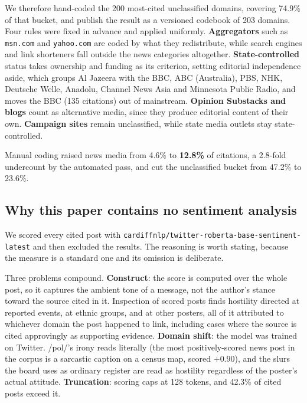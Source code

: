 \documentclass[11pt]{article}
\begin{document}
We therefore hand-coded the 200 most-cited unclassified domains, covering 74.9\%
of that bucket, and publish the result as a versioned codebook of 203 domains.
Four rules were fixed in advance and applied uniformly. \textbf{Aggregators}
such as \texttt{msn.com} and \texttt{yahoo.com} are coded by what they
redistribute, while search engines and link shorteners fall outside the news
categories altogether. \textbf{State-controlled} status takes ownership and
funding as its criterion, setting editorial independence aside, which groups Al
Jazeera with the BBC, ABC (Australia), PBS, NHK, Deutsche Welle, Anadolu,
Channel News Asia and Minnesota Public Radio, and moves the BBC (135 citations)
out of mainstream. \textbf{Opinion Substacks and blogs} count as alternative
media, since they produce editorial content of their own. \textbf{Campaign
sites} remain unclassified, while state media outlets stay state-controlled.

Manual coding raised news media from 4.6\% to \textbf{12.8\%} of citations, a
2.8-fold undercount by the automated pass, and cut the unclassified bucket from
47.2\% to 23.6\%.

\subsection{Why this paper contains no sentiment analysis}
\label{sec:nosentiment}

We scored every cited post with
\texttt{cardiffnlp/twitter-roberta-base-sentiment-latest}
\citep{barbieri2020,loureiro2022} and then excluded the results. The reasoning
is worth stating, because the measure is a standard one and its omission is
deliberate.

Three problems compound. \textbf{Construct}: the score is computed over the whole
post, so it captures the ambient tone of a message, not the author's stance
toward the source cited in it. Inspection of scored posts finds hostility
directed at reported events, at ethnic groups, and at other posters, all of it
attributed to whichever domain the post happened to link, including cases where
the source is cited approvingly as supporting evidence. \textbf{Domain shift}:
the model was trained on Twitter. /pol/'s irony reads literally (the most
positively-scored news post in the corpus is a sarcastic caption on a census
map, scored $+0.90$), and the slurs the board uses as ordinary register are read
as hostility regardless of the poster's actual attitude. \textbf{Truncation}:
scoring caps at 128 tokens, and 42.3\% of cited posts exceed it.
\end{document}
